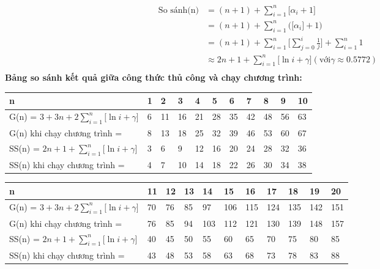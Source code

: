 \documentclass[10pt,a4paper]{article}
\begin{document}
    \begin{align*}
        \text{So sánh(n)}
        & = (n+1) + \sum_{i=1}^{n}\big[\alpha_i+1\big]\\
        & = (n+1) + \sum_{i=1}^{n}\big(\big[\alpha_i\big]+1\big)\\
        & = (n+1) + \sum_{i=1}^{n}\big[\sum_{j=0}^{i}\frac{1}{j}\big]+\sum_{i=1}^{n}1\\
        & \approx 2n+1 + \sum_{i=1}^{n}\big[\ln{i}+ \gamma\big](\text{với} \gamma \approx 0.5772)\\  
    \end{align*}
    \textbf{Bảng so sánh kết quả giữa công thức thủ công và chạy chương trình: }
    \fontsize{12}{14}\selectfont
    \renewcommand{\arraystretch}{2}
    \setlength{\arrayrulewidth}{1pt}
    \begin{table}[H]
        \centering
        \begin{tabular} [c]{|p{5cm}|p{0.75cm}|p{0.75cm}|p{0.75cm}|p{0.75cm}|p{0.75cm}|p{0.75cm}|p{0.75cm}|p{0.75cm}|p{0.75cm}|p{0.75cm}|}
        \hline
        \rowcolor[rgb]{0, .60, .800}
        n & 1 & 2 & 3 & 4 & 5 & 6 & 7 & 8 & 9 & 10 \\
        \hline
        G(n) = $3 + 3n + 2\sum_{i=1}^{n}\big[\ln{i}+ \gamma\big]$ & 6 & 11 & 16 & 21 & 28 & 35 & 42 & 48 & 56 & 63  \\
        \hline
        \rowcolor[rgb]{0, .60, .800}
        G(n) khi chạy chương trình = & 8 & 13 & 18 & 25 & 32 & 39 & 46 & 53 & 60 & 67 \\
        \hline 
        SS(n) = $2n+1 + \sum_{i=1}^{n}\big[\ln{i}+ \gamma\big]$ & 3 & 6 & 9 & 12 & 16 & 20 & 24 & 28 & 32 & 36 \\
        \hline
        \rowcolor[rgb]{0, .60, .800}
        SS(n) khi chạy chương trình = & 4 & 7 & 10 & 14 & 18 & 22 & 26 & 30 & 34 & 38 \\
        \hline
    \end{tabular}
    \end{table}
    \begin{table}[H]
        \centering
        \begin{tabular} [c]{|p{5cm}|p{0.75cm}|p{0.75cm}|p{0.75cm}|p{0.75cm}|p{0.75cm}|p{0.75cm}|p{0.75cm}|p{0.75cm}|p{0.75cm}|p{0.75cm}|}
        \hline
        \rowcolor[rgb]{0, .60, .800}
        n & 11 & 12 & 13 & 14 & 15 & 16 & 17 & 18 & 19 & 20 \\
        \hline
        G(n) = $3 + 3n + 2\sum_{i=1}^{n}\big[\ln{i}+ \gamma\big]$ & 70 & 76 & 85 & 97 & 106 & 115 & 124 & 135 & 142 & 151  \\
        \hline
        \rowcolor[rgb]{0, .60, .800}
        G(n) khi chạy chương trình = & 76 & 85 & 94 & 103 & 112 & 121 & 130 & 139 & 148 & 157 \\
        \hline 
        SS(n) = $2n+1 + \sum_{i=1}^{n}\big[\ln{i}+ \gamma\big]$ & 40 & 45 & 50 & 55 & 60 & 65 & 70 & 75 & 80 & 85 \\
        \hline
        \rowcolor[rgb]{0, .60, .800}
        SS(n) khi chạy chương trình = & 43 & 48 & 53 & 58 & 63 & 68 & 73 & 78 & 83 & 88 \\
        \hline
    \end{tabular}
    \end{table}
\end{document}
